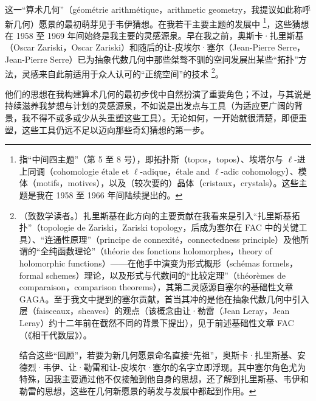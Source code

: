 这一“算术几何”（géométrie arithmétique，arithmetic geometry，我提议如此称呼新几何）愿景的最初萌芽见于韦伊猜想。在我若干主要主题的发展中 \footnote{指“中间四主题”（第 5 至 8 号），即拓扑斯（topos，topos）、埃塔尔与 $\ell$-进上同调（cohomologie étale et $\ell$-adique，étale and $\ell$-adic cohomology）、模体（motifs，motives），以及（较次要的）晶体（cristaux，crystals）。这些主题是我在 1958 至 1966 年间陆续提出的。}，这些猜想在 1958 至 1969 年间始终是我主要的灵感源泉。早在我之前，奥斯卡·扎里斯基（Oscar Zariski，Oscar Zariski）和随后的让-皮埃尔·塞尔（Jean-Pierre Serre，Jean-Pierre Serre）已为抽象代数几何中那些桀骜不驯的空间发展出某些“拓扑”方法，灵感来自此前适用于众人认可的“正统空间”的技术 \footnote{（致数学读者。）扎里斯基在此方向的主要贡献在我看来是引入“扎里斯基拓扑”（topologie de Zariski，Zariski topology，后成为塞尔在 FAC 中的关键工具）、“连通性原理”（principe de connexité，connectedness principle）及他所谓的“全纯函数理论”（théorie des fonctions holomorphes，theory of holomorphic functions）——在他手中演变为形式概形（schémas formels，formal schemes）理论，以及形式与代数间的“比较定理”（théorèmes de comparaison，comparison theorems），其第二灵感源自塞尔的基础性文章 GAGA。至于我文中提到的塞尔贡献，首当其冲的是他在抽象代数几何中引入层（faisceaux，sheaves）的观点（该概念由让·勒雷（Jean Leray，Jean Leray）约十二年前在截然不同的背景下提出），见于前述基础性文章 FAC（《相干代数层》）。

结合这些“回顾”，若要为新几何愿景命名直接“先祖”，奥斯卡·扎里斯基、安德烈·韦伊、让·勒雷和让-皮埃尔·塞尔的名字立即浮现。其中塞尔角色尤为特殊，因我主要通过他不仅接触到他自身的思想，还了解到扎里斯基、韦伊和勒雷的思想，这些在几何新愿景的萌发与发展中都起到作用。}。

他们的思想在我构建算术几何的最初步伐中自然扮演了重要角色；不过，与其说是持续滋养我梦想与计划的灵感源泉，不如说是出发点与工具（为适应更广阔的背景，我不得不或多或少从头重塑这些工具）。无论如何，一开始就很清楚，即便重塑，这些工具仍远不足以迈向那些奇幻猜想的第一步。